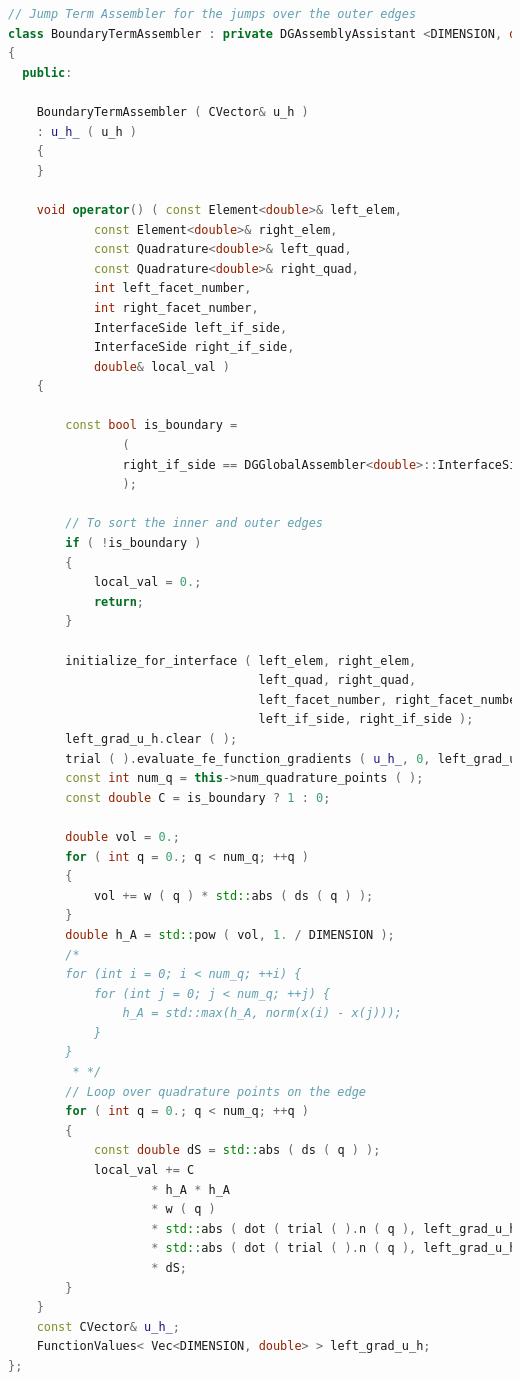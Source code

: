 \documentclass[a4paper, 11pt, twoside]{article}
\begin{document}
\begin{lstlisting}[language=C++, basicstyle={\footnotesize, \ttfamily}, keywordstyle=\color{blue}, numbers=none, tabsize=4]
// Jump Term Assembler for the jumps over the outer edges
class BoundaryTermAssembler : private DGAssemblyAssistant <DIMENSION, double>
{
  public:

    BoundaryTermAssembler ( CVector& u_h )
    : u_h_ ( u_h )
    {
    }

    void operator() ( const Element<double>& left_elem,
            const Element<double>& right_elem,
            const Quadrature<double>& left_quad,
            const Quadrature<double>& right_quad,
            int left_facet_number,
            int right_facet_number,
            InterfaceSide left_if_side,
            InterfaceSide right_if_side,
            double& local_val )
    {

        const bool is_boundary =
                (
                right_if_side == DGGlobalAssembler<double>::InterfaceSide::BOUNDARY
                );

        // To sort the inner and outer edges
        if ( !is_boundary )
        {
            local_val = 0.;
            return;
        }

        initialize_for_interface ( left_elem, right_elem,
                                   left_quad, right_quad,
                                   left_facet_number, right_facet_number,
                                   left_if_side, right_if_side );
        left_grad_u_h.clear ( );
        trial ( ).evaluate_fe_function_gradients ( u_h_, 0, left_grad_u_h );
        const int num_q = this->num_quadrature_points ( );
        const double C = is_boundary ? 1 : 0;

        double vol = 0.;
        for ( int q = 0.; q < num_q; ++q )
        {
            vol += w ( q ) * std::abs ( ds ( q ) );
        }
        double h_A = std::pow ( vol, 1. / DIMENSION );
        /*
        for (int i = 0; i < num_q; ++i) {
            for (int j = 0; j < num_q; ++j) {
                h_A = std::max(h_A, norm(x(i) - x(j)));
            }
        }
         * */
        // Loop over quadrature points on the edge
        for ( int q = 0.; q < num_q; ++q )
        {
            const double dS = std::abs ( ds ( q ) );
            local_val += C
                    * h_A * h_A
                    * w ( q )
                    * std::abs ( dot ( trial ( ).n ( q ), left_grad_u_h[q] ) )
                    * std::abs ( dot ( trial ( ).n ( q ), left_grad_u_h[q] ) )
                    * dS;
        }
    }
    const CVector& u_h_;
    FunctionValues< Vec<DIMENSION, double> > left_grad_u_h;
};
\end{lstlisting}
\end{document}
